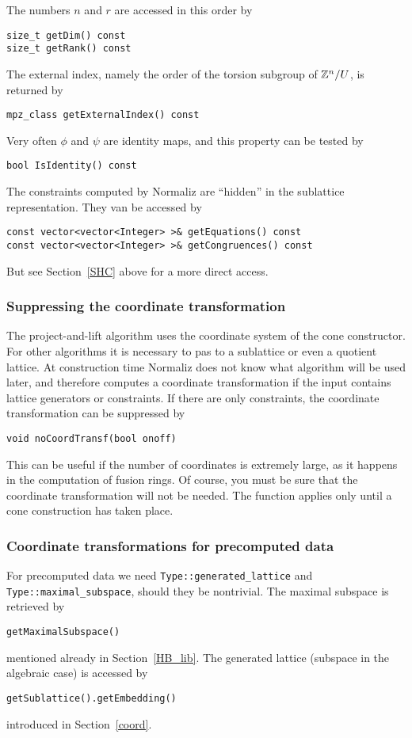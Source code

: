 \begin{small}
The numbers $n$ and $r$ are accessed in this order by
\begin{Verbatim}
size_t getDim() const
size_t getRank() const
\end{Verbatim}
The external index, namely the order of the torsion subgroup of ${\mathbb Z}^n/U$, is returned by
\begin{Verbatim}
mpz_class getExternalIndex() const
\end{Verbatim}
Very often $\phi$ and $\psi$ are identity maps, and this property can be tested by
\begin{Verbatim}
bool IsIdentity() const
\end{Verbatim}
The constraints computed by Normaliz are ``hidden'' in the sublattice representation. They van be accessed by
\begin{Verbatim}
const vector<vector<Integer> >& getEquations() const
const vector<vector<Integer> >& getCongruences() const
\end{Verbatim}

But see Section~\ref{SHC} above for a more direct access.

\subsubsection{Suppressing the coordinate transformation}

The project-and-lift algorithm uses the coordinate system of the cone constructor. For other algorithms it is necessary to pas to a sublattice or even a quotient lattice. At construction time Normaliz does not know what algorithm will be used later, and therefore computes a coordinate transformation if the input contains lattice generators or constraints. If there are only constraints, the coordinate transformation can be suppressed by
\begin{Verbatim}
void noCoordTransf(bool onoff)
\end{Verbatim}
This can be useful if the number of coordinates is extremely large, as it happens in the computation of fusion rings. Of course, you must be sure that the coordinate transformation will not be needed. The function applies only until a cone construction has taken place.

\subsubsection{Coordinate transformations for precomputed data}\label{coord_pre}

For precomputed data we need \verb|Type::generated_lattice| and \verb|Type::maximal_subspace|, should they be nontrivial. The maximal subspace is retrieved by
\begin{Verbatim}
getMaximalSubspace()
\end{Verbatim}
mentioned already in Section~\ref{HB_lib}. The generated lattice (subspace in the algebraic case) is accessed by
\begin{Verbatim}
getSublattice().getEmbedding()
\end{Verbatim}
introduced in Section~\ref{coord}.


\end{small}

